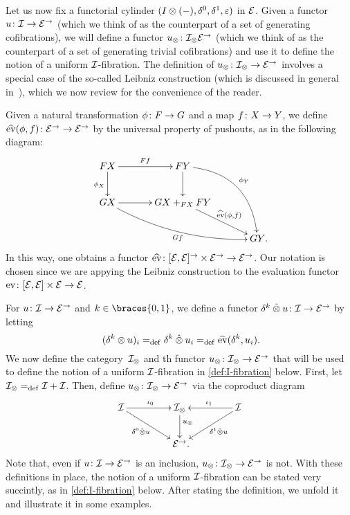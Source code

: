 \documentclass[reqno,10pt,a4paper,oneside,draft]{amsart}
\begin{document}
Let us now fix a functorial cylinder $(\interval \otimes (-), \lcyl, \rcyl, \ccyl)$ in $\calE$.
Given a functor $u \co \cal{I} \to \catE^\to$ (which we think of as the counterpart of a set of generating cofibrations), we will define a functor $u_\otimes \co \cal{I}_\otimes \catE^\to$ (which we think of as the counterpart of a set of generating trivial cofibrations) and use it to define the notion of a uniform $\cal{I}$-fibration.
The definition of $u_\otimes \co \cal{I}_\otimes \to \catE^\to$ involves a special case of the so-called Leibniz construction (which is discussed in general in~\cite{riehl-verity:reedy}), which we now review for the convenience of the reader.

Given a natural transformation $\phi \co F \to G$ and a map $f \co X \to Y$, we define $\widehat{\mathrm{ev}}(\phi, f) \co \catE^\to \to \catE^\to$ by the universal property of pushouts, as in the following diagram:
\begin{gather*}
\xymatrix@C=1.2cm{
  FX \ar[r]^{Ff} \ar[d]_{\phi_X} & FY \ar@/^2pc/[ddr]^{\phi_Y} \ar[d] & \\
  GX \ar@/_1pc/[drr]_{Gf} \ar[r] & GX +_{FX} FY  \ar[dr]^-{\widehat{\mathrm{ev}}(\phi, f)} & \\
  & & GY
\rlap{.}}
\end{gather*}
In this way, one obtains a functor $\widehat{\mathrm{ev}} \co [\catE, \catE]^\to \times \catE^\to \to \catE^\to$.
Our notation is chosen since we are appying the Leibniz construction to the evaluation functor $\mathrm{ev} \co [\catE,\catE] \times \calE \to \catE$.

For $u \co \cal{I} \to \catE^\to$ and $k \in \braces{0, 1}$, we define a functor $\kcyl \hatotimes u \co \cal{I} \to \catE^\to$ by letting
\[
(\kcyl \otimes u)_i \defeq \kcyl \hatotimes u_i  \defeq \widehat{\mathrm{ev}}(\kcyl, u_i)  \rlap{.}
\]
We now define the category~$\cal{I}_\otimes$ and th functor $u_\otimes \co \cal{I}_\otimes \to \catE^\to$ that will be used to define the notion of a uniform $\cal{I}$-fibration in \cref{def:I-fibration} below.
First, let $\cal{I}_\otimes \defeq \cal{I} + \cal{I}$.
Then, define $u_\otimes \co \cal{I}_\otimes \to \catE^\to$ via the coproduct diagram
\begin{equation}
\label{equ:u-tensor}
\begin{gathered}
\xymatrix@C+2em{
  \cal{I} \ar[r]^{\iota_0} \ar[dr]_-{\lcyl \hatotimes u} & \cal{I}_\otimes \ar[d]^(.4){u_\otimes} & \cal{I} \ar[dl]^-{\rcyl \hatotimes u} \ar[l]_{\iota_1} \\
  & \catE^\to
\rlap{.}}
\end{gathered}
\end{equation}
Note that, even if $u \co \cal{I} \to \catE^\to$ is an inclusion, $u_\otimes \co \cal{I}_\otimes \to \catE^\to$ is not.
With these definitions in place, the notion of a uniform $\cal{I}$-fibration can be stated very succintly, as in
\cref{def:I-fibration} below.
After stating the definition, we unfold it and illustrate it in some examples.
\end{document}
